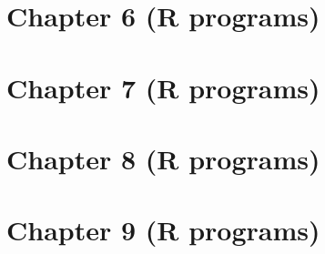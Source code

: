 \documentclass[12pt,a4paper]{article}
\begin{document}
\section{Chapter 6 (R programs)}
 
 
 
 
 
 
  \bigskip \bigskip
 
  \bigskip \bigskip
 
  \bigskip \bigskip
 
  \bigskip \bigskip
 

\clearpage
\section{Chapter 7 (R programs)}
 
  \bigskip \bigskip
 
  \bigskip \bigskip
 
  \bigskip \bigskip
 
  \bigskip \bigskip
 

\clearpage
\section{Chapter 8 (R programs)}
 
  \bigskip \bigskip
 
  \bigskip \bigskip
 
  \bigskip \bigskip
 

\clearpage
\section{Chapter 9 (R programs)}
 
  \bigskip \bigskip
 
  \bigskip \bigskip
 
  \bigskip \bigskip
 
  \bigskip \bigskip
 
  \bigskip \bigskip
 
  \bigskip \bigskip
 
\end{document}
